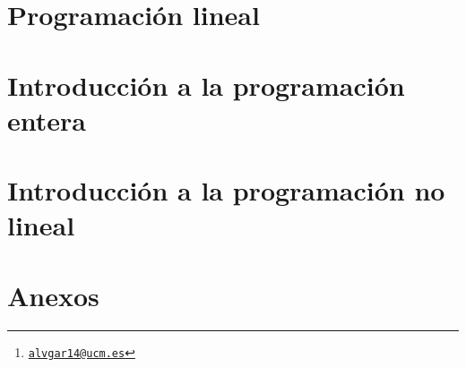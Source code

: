 \documentclass[a4paper, 10pt, twoside, titlepage, openright, onecolumn, final]{book}
\title{\tb{Investigación Operativa}}
\author{Álvaro García Tenorio
	\thanks{\texttt{\url{alvgar14@ucm.es}}}}
\date{\today}
\begin{document}
	\frontmatter
	\maketitle
	\tableofcontents
	
	
	\mainmatter
	\part{Programación lineal}
	
	
	
	\part{Introducción a la programación entera}
	
	
	\part{Introducción a la programación no lineal}
	
	\appendix
	\part{Anexos}
	
	\backmatter
	\printindex[general]
\end{document}
